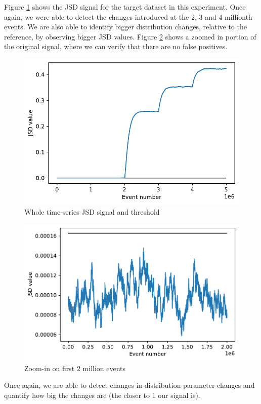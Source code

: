 \documentclass[sigconf]{acmart}
\begin{document}
Figure \ref{fig:JSD-signal-test03} shows the JSD signal for the target dataset in this experiment. Once again, we were able to detect the changes introduced at the 2, 3 and 4 millionth events. We are also able to identify bigger distribution changes, relative to the reference, by observing bigger JSD values. Figure \ref{fig:JSD-signal-zoom-test03} shows a zoomed in portion of the original signal, where we can verify that there are no false positives.
\begin{figure}[!htb]
    \begin{center}
      \includegraphics[scale=0.5]{figures/stream-analysis-viz-test03.pdf}
      \caption{Whole time-series JSD signal and threshold}
      \label{fig:JSD-signal-test03}
    \end{center}
\end{figure}
\begin{figure}[!htb]
    \begin{center}
      \includegraphics[scale=0.5]{figures/stream-analysis-viz-zoom-test03.pdf}
      \caption{Zoom-in on first 2 million events}
     \label{fig:JSD-signal-zoom-test03}
    \end{center}
\end{figure}
Once again, we are able to detect changes in distribution parameter changes and quantify how big the changes are (the closer to 1 our signal is).
\end{document}
